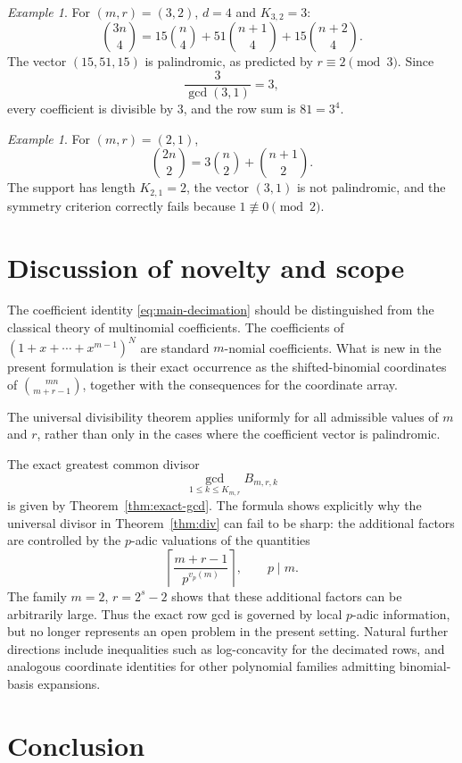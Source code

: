 \documentclass[11pt]{article}
\theoremstyle{definition}
\theoremstyle{remark}
\newtheorem{example}[theorem]{Example}
\begin{document}
\begin{example}
For $(m,r)=(3,2)$, $d=4$ and $K_{3,2}=3$:
\[
 \binom{3n}{4}
 =
 15\binom{n}{4}
 +51\binom{n+1}{4}
 +15\binom{n+2}{4}.
\]
The vector $(15,51,15)$ is palindromic, as predicted by
$r\equiv2\pmod3$. Since
\[
 \frac{3}{\gcd(3,1)}=3,
\]
every coefficient is divisible by $3$, and the row sum is
$81=3^4$.
\end{example}

\begin{example}
For $(m,r)=(2,1)$,
\[
 \binom{2n}{2}
 =
 3\binom{n}{2}+\binom{n+1}{2}.
\]
The support has length $K_{2,1}=2$, the vector $(3,1)$ is not palindromic,
and the symmetry criterion correctly fails because $1\not\equiv0\pmod2$.
\end{example}

\section{Discussion of novelty and scope}

The coefficient identity \eqref{eq:main-decimation} should be distinguished
from the classical theory of multinomial coefficients. The coefficients of
$(1+x+\cdots+x^{m-1})^N$ are standard $m$-nomial coefficients. What is new
in the present formulation is their exact occurrence as the shifted-binomial
coordinates of $\binom{mn}{m+r-1}$, together with the consequences for the
coordinate array.

The universal divisibility theorem applies uniformly for all admissible
values of $m$ and $r$, rather than only in the cases where the coefficient
vector is palindromic.

The exact greatest common divisor
\[
 \gcd_{1\le k\le K_{m,r}}B_{m,r,k}
\]
is given by Theorem~\ref{thm:exact-gcd}. The formula shows explicitly why
the universal divisor in Theorem~\ref{thm:div} can fail to be sharp: the
additional factors are controlled by the $p$-adic valuations of the
quantities
\[
 \left\lceil\frac{m+r-1}{p^{v_p(m)}}\right\rceil,
 \qquad p\mid m.
\]
The family $m=2$, $r=2^s-2$ shows that these additional factors can be
arbitrarily large. Thus the exact row gcd is governed by local
$p$-adic information, but no longer represents an open problem in the
present setting. Natural further directions include inequalities such as
log-concavity for the decimated rows, and analogous coordinate identities
for other polynomial families admitting binomial-basis expansions.

\section{Conclusion}
\end{document}
